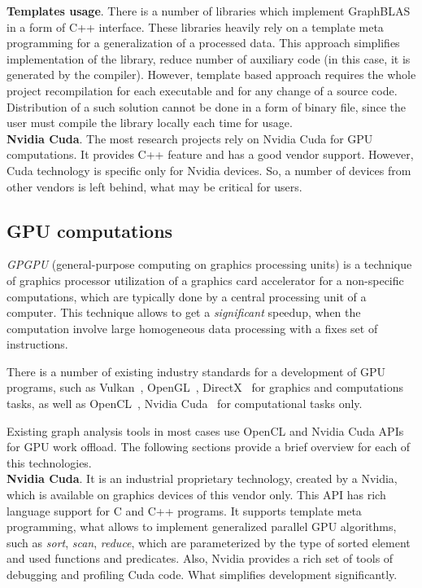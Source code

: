 \textbf{Templates usage}. There is a number of libraries which implement GraphBLAS in a form of C++ interface. These libraries heavily rely on a template meta programming for a generalization of a processed data. This approach simplifies implementation of the library, reduce number of auxiliary code (in this case, it is generated by the compiler). However, template based approach requires the whole project recompilation for each executable and for any change of a source code. Distribution of a such solution cannot be done in a form of binary file, since the user must compile the library locally each time for usage.\\

\textbf{Nvidia Cuda}. The most research projects rely on Nvidia Cuda for GPU computations. It provides C++ feature and has a good vendor support. However, Cuda technology is specific only for Nvidia devices. So, a number of devices from other vendors is left behind, what may be critical for users.

\subsection{GPU computations}

\textit{GPGPU} (general-purpose computing on graphics processing units) is a technique of graphics processor utilization of a graphics card accelerator for a non-specific computations, which are typically done by a central processing unit of a computer. This technique allows to get a \textit{significant} speedup, when the computation involve large homogeneous data processing with a fixes set of instructions.

There is a number of existing industry standards for a development of GPU programs, such as Vulkan~\cite{net:spec_vulkan}, OpenGL~\cite{net:spec_opencl}, DirectX~\cite{net:spec_direct3d} for graphics and computations tasks, as well as OpenCL~\cite{net:spec_opencl}, Nvidia Cuda~\cite{net:cuda_toolkit_docs}
for computational tasks only.

Existing graph analysis tools in most cases use OpenCL and Nvidia Cuda APIs for GPU work offload. The following sections provide a brief overview for each of this technologies.\\

\textbf{Nvidia Cuda}. It is an industrial proprietary technology, created by a Nvidia, which is available on graphics devices of this vendor only. This API has rich language support for C and C++ programs. It supports template meta programming, what allows to implement generalized parallel GPU algorithms, such as \textit{sort}, \textit{scan}, \textit{reduce}, which are parameterized by the type of sorted element and used functions and predicates. Also, Nvidia provides a rich set of tools of debugging and profiling Cuda code. What simplifies development significantly.\\

